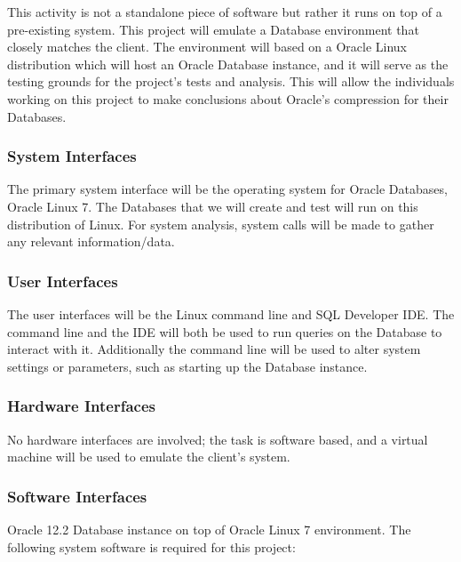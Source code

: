 \documentclass[10pt]{article}
\begin{document}
This activity is not a standalone piece of software but rather it runs on top of a pre-existing system. This project will emulate a Database environment that closely matches the client. The environment will based on a Oracle Linux distribution which will host an Oracle Database instance, and it will serve as the testing grounds for the project's tests and analysis. This will allow the individuals working on this project to make conclusions about Oracle's compression for their Databases.


\subsubsection{System Interfaces}

The primary system interface will be the operating system for Oracle Databases, Oracle Linux 7. The Databases that we will create and test will run on this distribution of Linux. For system analysis, system calls will be made to gather any relevant information/data.


\subsubsection{User Interfaces}

The user interfaces will be the Linux command line and SQL Developer IDE. The command line and the IDE will both be used to run queries on the Database to interact with it. Additionally the command line will be used to alter system settings or parameters, such as starting up the Database instance.


\subsubsection{Hardware Interfaces}

No hardware interfaces are involved; the task is software based, and a virtual machine will be used to emulate the client's system. 


\subsubsection{Software Interfaces}

Oracle 12.2 Database instance on top of Oracle Linux 7 environment. The following system software is required for this project:
\end{document}
